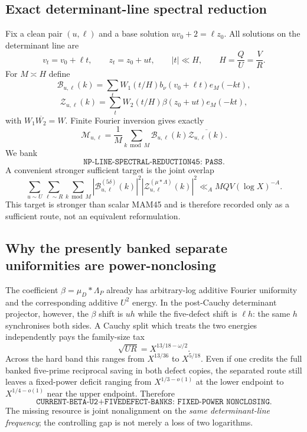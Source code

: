 \documentclass[11pt]{article}
\theoremstyle{definition}
\newcommand{\1}{\mathbf 1}
\begin{document}
\subsection{Exact determinant-line spectral reduction}
Fix a clean pair $(u,\ell)$ and a base solution $uv_0+2=\ell z_0$.
All solutions on the determinant line are
\[
 v_t=v_0+\ell t,\qquad z_t=z_0+ut,\qquad |t|\ll H,
 \qquad H=\frac QU=\frac VR.
\]
For $M\asymp H$ define
\[
 \mathcal B_{u,\ell}(k)
 =\sum_tW_1(t/H)b_\nu(v_0+\ell t)e_M(-kt),
\]
\[
 \mathcal Z_{u,\ell}(k)
 =\sum_tW_2(t/H)\beta(z_0+ut)e_M(-kt),
\]
with $W_1\overline{W_2}=W$.  Finite Fourier inversion gives exactly
\begin{equation}
 \boxed{
 \mathcal M_{u,\ell}
 =\frac1M\sum_{k\bmod M}
 \mathcal B_{u,\ell}(k)\overline{\mathcal Z_{u,\ell}(k)}.
 }
\label{eq:d14-line-fourier}
\end{equation}
We bank
\[
 \boxed{\texttt{NP-LINE-SPECTRAL-REDUCTION45: PASS}.}
\]
A convenient stronger sufficient target is the joint overlap
\begin{equation}
 \boxed{
 \sum_{u\sim U}\sum_{\ell\sim R}\sum_{k\bmod M}
 |\mathcal B^{(5\delta)}_{u,\ell}(k)|^2
 |\mathcal Z^{(\mu*\Lambda)}_{u,\ell}(k)|^2
 \ll_A MQV(\log X)^{-A}.
 }
\label{eq:d14-line-overlap}
\end{equation}
This target is stronger than scalar MAM45 and is therefore recorded only as a
sufficient route, not an equivalent reformulation.

\subsection{Why the presently banked separate uniformities are power-nonclosing}
The coefficient $\beta=\mu_D*\Lambda_P$ already has arbitrary-log additive
Fourier uniformity and the corresponding additive $U^2$ energy.  In the
post-Cauchy determinant projector, however, the $\beta$ shift is $uh$ while
the five-defect shift is $\ell h$: the same $h$ synchronises both sides.  A
Cauchy split which treats the two energies independently pays the family-size
tax
\[
 \sqrt{UR}=X^{13/18-\omega/2}.
\]
Across the hard band this ranges from $X^{13/36}$ to $X^{5/18}$.  Even if one
credits the full banked five-prime reciprocal saving in both defect copies,
the separated route still leaves a fixed-power deficit ranging from
$X^{1/3-o(1)}$ at the lower endpoint to $X^{1/4-o(1)}$ near the upper endpoint.
Therefore
\[
 \boxed{\texttt{CURRENT-BETA-U2+FIVEDEFECT-BANKS: FIXED-POWER NONCLOSING}.}
\]
The missing resource is joint nonalignment on the \emph{same determinant-line
frequency}; the controlling gap is not merely a loss of two logarithms.
\end{document}
